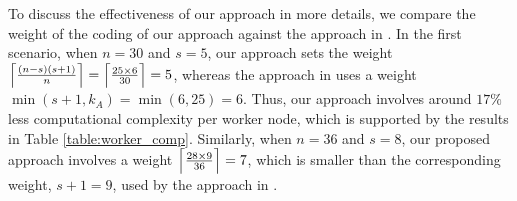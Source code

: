 To discuss the effectiveness of our approach in more details, we compare the weight of the coding of our approach against the approach in \cite{das2023jsait_submitted}. In the first scenario, when $n = 30$ and $s = 5$, our approach sets the weight $\Bigl\lceil{\frac{(n-s)(s+1)}{n}}\Bigr\rceil = \Bigl\lceil{\frac{25 \times 6}{30}}\Bigr\rceil = 5$, whereas the approach in \cite{das2023jsait_submitted} uses a weight $\min(s+1, k_A) = \min(6, 25) = 6$. Thus, our approach involves around $17\%$ less computational complexity per worker node, which is supported by the results in Table \ref{table:worker_comp}. Similarly, when $n = 36$ and $s = 8$, our proposed approach involves a weight $\Bigl\lceil{\frac{28 \times 9}{36}}\Bigr\rceil = 7$, which is smaller than the corresponding weight, $s + 1 = 9$, used by the approach in \cite{das2023jsait_submitted}.


